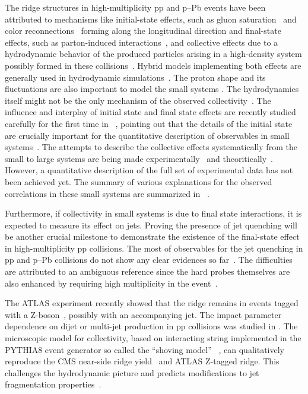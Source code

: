 The ridge structures in high-multiplicity pp and p--Pb events have been attributed to mechanisms like initial-state effects, such as gluon saturation~\cite{Dusling:2012cg,Bzdak:2013zma} and color reconnections~\cite{Ortiz:2013yxa,Sarma:2019teo} forming along the longitudinal direction and final-state effects, such as parton-induced interactions~\cite{Arbuzov:2011yr}, and collective effects due to a hydrodynamic behavior of the produced particles arising in a high-density system possibly formed in these collisions~\cite{Weller:2017tsr,Zhao:2017rgg}. 
Hybrid models implementing both effects are generally used in hydrodynamic simulations~\cite{Greif:2017bnr,Mantysaari:2017cni}. 
The proton shape and its fluctuations are also important to model the small systems \cite{Mantysaari:2017cni}.
The hydrodynamics itself might not be the only mechanism of the observed collectivity~\cite{Zhao:2020pty}. 
The influence and interplay of initial state and final state effects are recently studied carefully for the first time in ~\cite{Greif:2019ygb}, pointing out that the details of the initial state are crucially important for the quantitative description of observables in small systems~\cite{Schenke:2019pmk}. 
The attempts to describe the collective effects systematically from the small to large systems are being made experimentally~\cite{Acharya:2019vdf} and theoritically~\cite{Greif:2019ygb}.
However, a quantitative description of the full set of experimental data has not been achieved yet.
The summary of various explanations for the observed correlations in these small systems are summarized in ~\cite{Strickland:2018exs,Loizides:2016tew,Nagle:2018nvi}.

Furthermore, if collectivity in small systems is due to final state interactions, it is expected to measure its effect on jets. Proving the presence of jet quenching will be another crucial milestone to demonstrate the existence of the final-state effect in high-multiplicity pp collisions. The most of observables for the jet quenching in pp and p--Pb collisions do not show any clear evidences so far~\cite{Khachatryan:2016odn,Adam:2016jfp,Adam:2016dau,Acharya:2017okq}. The difficulties are attributed to an ambiguous reference since the hard probes themselves are also enhanced by requiring high multiplicity in the event~\cite{Adam:2016jfp,Acharya:2018egz}.

The ATLAS experiment recently showed that the ridge remains in events tagged with a Z-boson~\cite{Aaboud:2019mcw}, possibly with an accompanying jet.
The impact parameter dependence on dijet or multi-jet production in pp collisions was studied in \cite{Frankfurt:2003td}.
The microscopic model for collectivity, based on interacting string implemented in the PYTHIA8 event generator so called the ``shoving model''~\cite{Bierlich:2017vhg} , can qualitatively reproduce the CMS near-side ridge yield~\cite{Khachatryan:2016txc} and ATLAS Z-tagged ridge. This challenges the hydrodynamic picture and predicts modifications to jet fragmentation
properties~\cite{Bierlich:2019ixq}.


